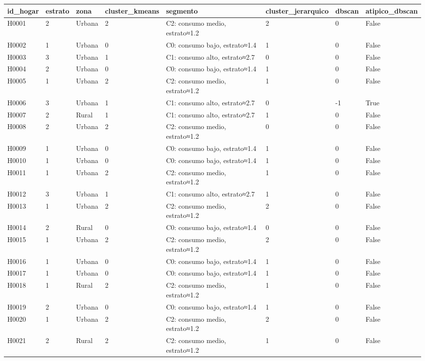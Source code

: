{\footnotesize\begin{longtable}{@{}llllp{}lll@{}}
\toprule
id\_hogar & estrato & zona & cluster\_kmeans & segmento & cluster\_jerarquico & dbscan & atipico\_dbscan \\
\midrule\endhead
H0001 & 2 & Urbana & 2 & C2: consumo medio, estrato≈1.2 & 2 & 0 & False \\
H0002 & 1 & Urbana & 0 & C0: consumo bajo, estrato≈1.4 & 1 & 0 & False \\
H0003 & 3 & Urbana & 1 & C1: consumo alto, estrato≈2.7 & 0 & 0 & False \\
H0004 & 2 & Urbana & 0 & C0: consumo bajo, estrato≈1.4 & 1 & 0 & False \\
H0005 & 1 & Urbana & 2 & C2: consumo medio, estrato≈1.2 & 1 & 0 & False \\
H0006 & 3 & Urbana & 1 & C1: consumo alto, estrato≈2.7 & 0 & -1 & True \\
H0007 & 2 & Rural & 1 & C1: consumo alto, estrato≈2.7 & 1 & 0 & False \\
H0008 & 2 & Urbana & 2 & C2: consumo medio, estrato≈1.2 & 0 & 0 & False \\
H0009 & 1 & Urbana & 0 & C0: consumo bajo, estrato≈1.4 & 1 & 0 & False \\
H0010 & 1 & Urbana & 0 & C0: consumo bajo, estrato≈1.4 & 1 & 0 & False \\
H0011 & 1 & Urbana & 2 & C2: consumo medio, estrato≈1.2 & 1 & 0 & False \\
H0012 & 3 & Urbana & 1 & C1: consumo alto, estrato≈2.7 & 1 & 0 & False \\
H0013 & 1 & Urbana & 2 & C2: consumo medio, estrato≈1.2 & 2 & 0 & False \\
H0014 & 2 & Rural & 0 & C0: consumo bajo, estrato≈1.4 & 0 & 0 & False \\
H0015 & 1 & Urbana & 2 & C2: consumo medio, estrato≈1.2 & 2 & 0 & False \\
H0016 & 1 & Urbana & 0 & C0: consumo bajo, estrato≈1.4 & 1 & 0 & False \\
H0017 & 1 & Urbana & 0 & C0: consumo bajo, estrato≈1.4 & 1 & 0 & False \\
H0018 & 1 & Rural & 2 & C2: consumo medio, estrato≈1.2 & 1 & 0 & False \\
H0019 & 2 & Urbana & 0 & C0: consumo bajo, estrato≈1.4 & 1 & 0 & False \\
H0020 & 1 & Urbana & 2 & C2: consumo medio, estrato≈1.2 & 2 & 0 & False \\
H0021 & 2 & Rural & 2 & C2: consumo medio, estrato≈1.2 & 1 & 0 & False \\

\end{longtable}}
